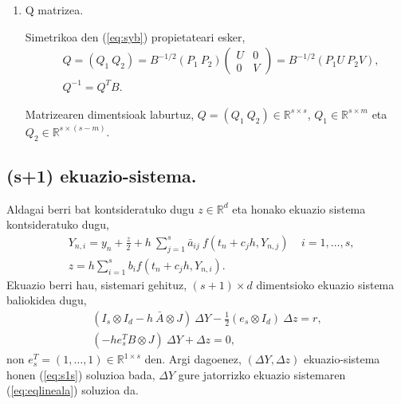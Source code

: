 \begin{enumerate}
\item Q matrizea.

Simetrikoa den (\ref{eq:syb}) propietateari esker,
\begin{align*}
&Q=(Q_1 \ Q_2)=
B^{-1/2}(P_1 \ P_2)
\left(
\begin{matrix}
U & 0 \\
0 & V
\end{matrix}
\right)=
B^{-1/2} (P_1U \ P_2V), \\
&Q^{-1}=Q^TB.
\end{align*}  

Matrizearen dimentsioak laburtuz, $Q=(Q_1 \ Q_2) \in \mathbb{R}^{s \times s}$, $Q_1 \in \mathbb{R}^{s \times m}$ eta $Q_2 \in \mathbb{R}^{s \times (s-m)}$.

\end{enumerate}

\subsection*{(s+1) ekuazio-sistema.}

Aldagai berri bat kontsideratuko dugu $z \in \mathbb{R}^d$ eta honako ekuazio sistema kontsideratuko dugu,
\begin{align*}
&Y_{n,i}=y_n+\frac{z}{2}+ h\ \sum^s_{j=1}{\bar{a}_{ij}\ f(t_n+c_jh,Y_{n,j})}\ \ \ \ \ i=1 ,\dots, s,\\
&z=h \sum_{i=1}^{s} {b_i f(t_n+c_jh,Y_{n,i})}.
\end{align*} 
Ekuazio berri hau, sistemari gehituz, $(s+1) \times d$ dimentsioko ekuazio sistema baliokidea dugu,
\begin{align}
\label{eq:s1s}
(I_s \otimes I_d- h \ \bar{A} \otimes J) \ \Delta Y - \frac{1}{2}(e_s \otimes I_d) \ \Delta z =r,\\
(-h e_s^T B \otimes J) \ \Delta Y+  \Delta z=0,
\end{align}
non $e_s^T=(1,\dots,1) \in \mathbb{R}^{1 \times s}$ den. Argi dagoenez, $(\Delta Y, \Delta z)$ ekuazio-sistema honen (\ref{eq:s1s}) soluzioa bada, $\Delta Y$ gure jatorrizko ekuazio sistemaren (\ref{eq:eqlineala}) soluzioa da.

